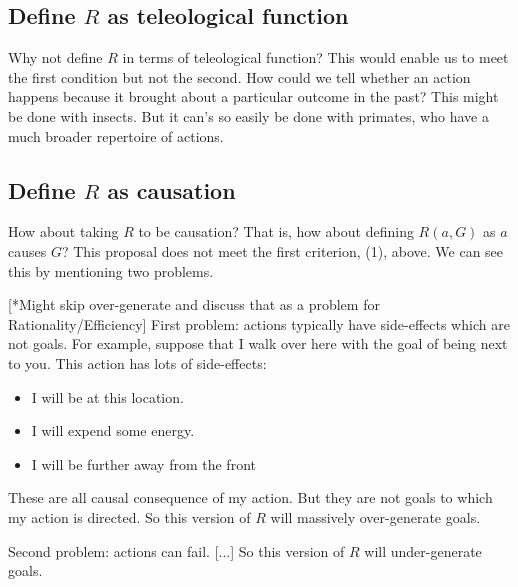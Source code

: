 \documentclass[12pt,\papersize]{extarticle}
\begin{document}
\subsection{Define $R$ as teleological function}
Why not define $R$ in terms of teleological function?
This would enable us to meet the first condition but not the second.
How could we tell whether an action happens because it brought about a particular outcome in the past? 
This might be done with insects.
But it can's so easily be done with primates, who have a much broader repertoire of actions.

\subsection{Define $R$ as causation}
How about taking $R$ to be causation?
That is, how about defining $R(a,G)$ as $a$ causes $G$?
This proposal does not meet the first criterion, (1), above.
We can see this by mentioning two problems.

[*Might skip over-generate and discuss that as a problem for Rationality/Efficiency]
First problem: actions typically have side-effects which are not goals.
For example,
suppose that I walk over here with the goal of being next to you.
This action has lots of side-effects: 
\begin{itemize}
\item 	I will be at this location.
\item	I will expend some energy.
\item	I will be further away from the front
\end{itemize}
These are all causal consequence of my action.
But they are not goals to which my action is directed.
So this version of $R$ will massively over-generate goals.

Second problem: actions can fail.  [...]
So this version of $R$ will under-generate goals.
\end{document}
